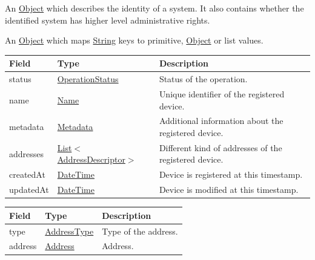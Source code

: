 \documentclass[a4paper]{arrowhead}
\newcommand{\pref}[1]{{\textcolor{ArrowheadGrey}{\hyperref[sec:model:primitives:#1]{#1}}}}
\begin{document}

An \pref{Object} which describes the identity of a system. It also contains whether the identified system has higher level administrative rights.

\label{sec:model:Metadata}

An \pref{Object} which maps \pref{String} keys to primitive, \pref{Object} or list values.

 
\begin{table}[ht!]
\begin{tabularx}{\textwidth}{| p{4.25cm} | p{4cm} | X |} \hline
\rowcolor{gray!33} Field & Type      & Description \\ \hline
status & \pref{OperationStatus} & Status of the operation. \\ \hline
name & \pref{Name} & Unique identifier of the registered device. \\ \hline
metadata & \hyperref[sec:model:Metadata]{Metadata} & Additional information about the registered device. \\ \hline
addresses &  \pref{List}$<$\hyperref[sec:model:AddressDescriptor]{AddressDescriptor}$>$ & Different kind of addresses of the registered device.  \\ \hline
createdAt & \pref{DateTime} & Device is registered at this timestamp. \\ \hline
updatedAt & \pref{DateTime} & Device is modified at this timestamp. \\ \hline
\end{tabularx}
\end{table}

\clearpage

\label{sec:model:AddressDescriptor}

\begin{table}[ht!]
\begin{tabularx}{\textwidth}{| p{4.25cm} | p{3.5cm} | X |} \hline
\rowcolor{gray!33} Field & Type      & Description \\ \hline
type & \pref{AddressType} & Type of the address. \\ \hline
address & \pref{Address} & Address. \\ \hline
\end{tabularx}
\end{table}

\label{sec:model:ErrorResponse}
\end{document}
